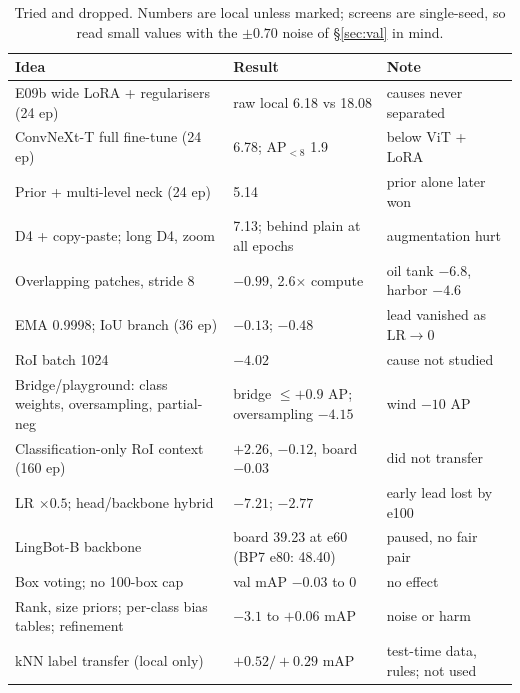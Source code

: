 \begin{table}[t]
\centering\footnotesize\setlength{\tabcolsep}{3.5pt}
\begin{tabular}{@{}p{7.2cm}p{5.4cm}p{4.2cm}@{}}
\toprule
Idea & Result & Note\\
\midrule
E09b wide LoRA + regularisers (24 ep) & raw local \dm{} 6.18 vs 18.08 & causes never separated\\
ConvNeXt-T full fine-tune (24 ep) & 6.78; AP$_{<8}$ 1.9 & below ViT + LoRA\\
Prior + multi-level neck (24 ep) & 5.14 & prior alone later won\\
D4 + copy-paste; long D4, zoom & 7.13; behind plain at all epochs & augmentation hurt\\
Overlapping patches, stride 8 & $-0.99$, 2.6$\times$ compute & oil tank $-6.8$, harbor $-4.6$\\
EMA 0.9998; IoU branch (36 ep) & $-0.13$; $-0.48$ & lead vanished as LR$\to$0\\
RoI batch 1024 & $-4.02$ & cause not studied\\
Bridge/playground: class weights, oversampling, partial-neg & bridge $\le+0.9$ AP; oversampling $-4.15$ & wind $-10$ AP\\
Classification-only RoI context (160 ep) & $+2.26$, $-0.12$, board $-0.03$ & did not transfer\\
LR $\times0.5$; head/backbone hybrid & $-7.21$; $-2.77$ & early lead lost by e100\\
LingBot-B backbone & board 39.23 at e60 (BP7 e80: 48.40) & paused, no fair pair\\
Box voting; no 100-box cap & val mAP $-0.03$ to $0$ & no effect\\
Rank, size priors; per-class bias tables; refinement & $-3.1$ to $+0.06$ mAP & noise or harm\\
kNN label transfer (local only) & $+0.52/+0.29$ mAP & test-time data, rules; not used\\
\bottomrule
\end{tabular}
\caption{Tried and dropped. Numbers are local \dm{} unless marked; screens are single-seed, so read small values with the $\pm0.70$ noise of \S\ref{sec:val} in mind.}
\label{tab:neg}
\end{table}
